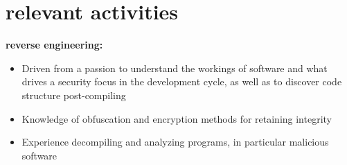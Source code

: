 \documentclass[]{friggeri-cv}
\begin{document}
\section{relevant activities}
{\bf reverse engineering: }
{
  \setlength{\itemsep}{0pt}
  \setlength{\parskip}{0pt}
  \setlength{\parsep}{0pt}
  \setlength{\itemindent}{0em}
  \setlength{\leftmargin}{0em}
\begin{itemize}
\item Driven from a passion to understand the workings of software and what drives a security focus in the development cycle, as well as to discover code structure post-compiling
\item Knowledge of obfuscation and encryption methods for retaining integrity
\item Experience decompiling and analyzing programs, in particular malicious software
\end{itemize}
}
\end{document}
